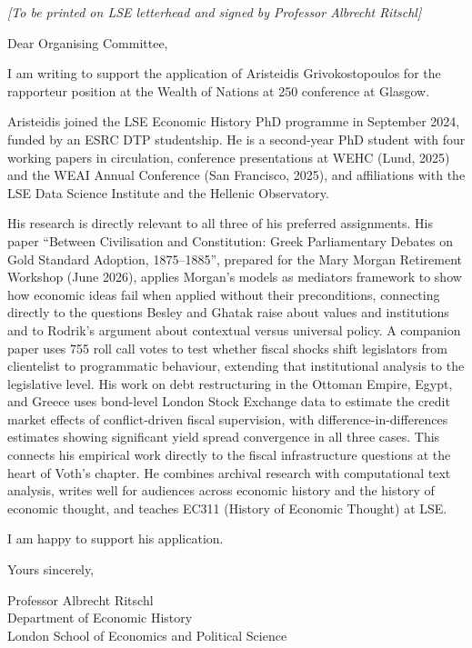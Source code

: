 \documentclass[11pt,a4paper]{article}
\begin{document}
\noindent
\textit{[To be printed on LSE letterhead and signed by Professor Albrecht Ritschl]}

\bigskip

\noindent [Date]

\bigskip

\noindent Dear Organising Committee,

I am writing to support the application of Aristeidis Grivokostopoulos for the rapporteur position at the Wealth of Nations at 250 conference at Glasgow.

Aristeidis joined the LSE Economic History PhD programme in September 2024, funded by an ESRC DTP studentship. He is a second-year PhD student with four working papers in circulation, conference presentations at WEHC (Lund, 2025) and the WEAI Annual Conference (San Francisco, 2025), and affiliations with the LSE Data Science Institute and the Hellenic Observatory.

His research is directly relevant to all three of his preferred assignments. His paper ``Between Civilisation and Constitution: Greek Parliamentary Debates on Gold Standard Adoption, 1875--1885'', prepared for the Mary Morgan Retirement Workshop (June 2026), applies Morgan's models as mediators framework to show how economic ideas fail when applied without their preconditions, connecting directly to the questions Besley and Ghatak raise about values and institutions and to Rodrik's argument about contextual versus universal policy. A companion paper uses 755 roll call votes to test whether fiscal shocks shift legislators from clientelist to programmatic behaviour, extending that institutional analysis to the legislative level. His work on debt restructuring in the Ottoman Empire, Egypt, and Greece uses bond-level London Stock Exchange data to estimate the credit market effects of conflict-driven fiscal supervision, with difference-in-differences estimates showing significant yield spread convergence in all three cases. This connects his empirical work directly to the fiscal infrastructure questions at the heart of Voth's chapter. He combines archival research with computational text analysis, writes well for audiences across economic history and the history of economic thought, and teaches EC311 (History of Economic Thought) at LSE.

I am happy to support his application.

\bigskip

\noindent Yours sincerely,

\bigskip\bigskip

\noindent Professor Albrecht Ritschl\\
Department of Economic History\\
London School of Economics and Political Science
\end{document}
